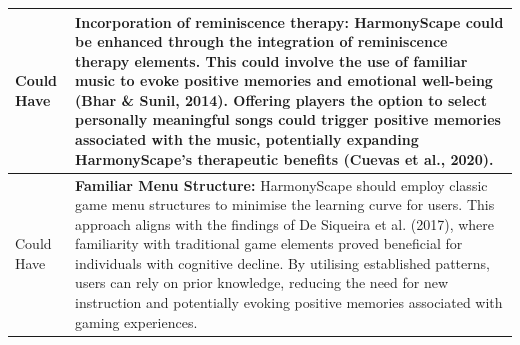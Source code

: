 \documentclass{l4proj}
\begin{document}
\begin{longtable}{|p{4cm}|p{10cm}|}
\hline
Could Have & \textbf{Incorporation of reminiscence therapy:} HarmonyScape could be enhanced through the integration of reminiscence therapy elements. This could involve the use of familiar music to evoke positive memories and emotional well-being (Bhar \& Sunil, 2014). Offering players the option to select personally meaningful songs could trigger positive memories associated with the music, potentially expanding HarmonyScape's therapeutic benefits (Cuevas et al., 2020). \\ 
\hline
Could Have & \textbf{Familiar Menu Structure:} HarmonyScape should employ classic game menu structures to minimise the learning curve for users. This approach aligns with the findings of De Siqueira et al. (2017), where familiarity with traditional game elements proved beneficial for individuals with cognitive decline. By utilising established patterns, users can rely on prior knowledge, reducing the need for new instruction and potentially evoking positive memories associated with gaming experiences. \\
\end{longtable}
\end{document}
